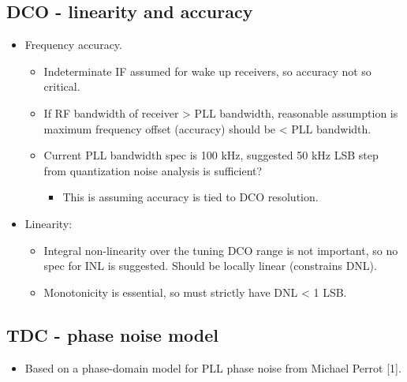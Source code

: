 \documentclass[10pt,a4paper]{article}
\begin{document}
		\subsection{DCO - linearity and accuracy}
		\vspace{-.2em}
		\begin{itemize}
			\footnotesize
			\item Frequency accuracy.
				\begin{itemize}
					\scriptsize			
					\item Indeterminate IF assumed for wake up receivers, so accuracy not so critical.
					\item If RF bandwidth of receiver > PLL bandwidth, reasonable assumption is maximum frequency offset (accuracy) should be < PLL bandwidth.
					\item Current PLL bandwidth spec is 100 kHz, suggested 50 kHz LSB step from quantization noise analysis is sufficient?
					\begin{itemize}
						\scriptsize			
						\item This is assuming accuracy is tied to DCO resolution.
					\end{itemize} 
				\end{itemize} 	
			\item Linearity:
			\begin{itemize}
				\scriptsize			
				\item Integral non-linearity over the tuning DCO range is not important, so no spec for INL is suggested. Should be locally linear (constrains DNL).
				\item Monotonicity is essential, so must strictly have DNL < 1 LSB.
			\end{itemize} 
		\end{itemize} 

		\flushleft
		\subsection{TDC - phase noise model}
 		\begin{itemize}
			\scriptsize
			\item Based on a phase-domain model for PLL phase noise from Michael Perrot [1].

		\end{itemize}  
\end{document}
